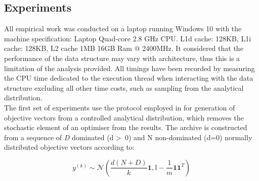 \documentclass{ecmm427_assignment}
\begin{document}
\subsection{Experiments}
All empirical work was conducted on a laptop running Windows 10 with the machine specification:
Laptop Quad-core 2.8 GHz CPU. L1d cache: 128KB, L1i cache: 128KB, L2 cache 1MB 16GB Ram $@$ 2400MHz. It considered that the  performance of the data structure may vary with architecture, thus this is a limitation of the analysis provided. All timings have been recorded by measuring the CPU time dedicated to the execution thread when interacting with the data structure excluding all other time costs, such as sampling from the analytical distribution.\\
The first set of experiments use the protocol employed in \cite{Glasmachers2017} for generation of objective vectors from a controlled analytical distribution, which removes the stochastic element of an optimiser from the results. The archive is constructed from a sequence of \textit{D} dominated (d \textgreater\ 0) and N non-dominated (d=0) normally distributed objective vectors according to:

\begin{equation}
\label{eqn:Analytical Distribution}
    y^{(k)} \sim \mathcal{N} \left( \frac{d(N+D)}{k} \mathbf{1}, \mathbb{I} - \frac{1}{m} \mathbf{1} \mathbf{1} ^ T \right)
\end{equation}
\end{document}
